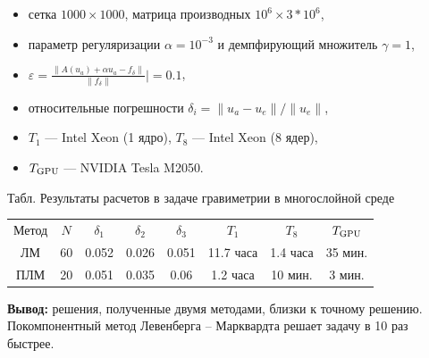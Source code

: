 \documentclass[10pt,pdf, mathserif, hyperref={unicode}]{beamer}
\begin{document}
\begin{frame}
	\begin{itemize}
		\item сетка $1000\times1000$, матрица производных $10^6\times 3*10^6$,
		\item параметр регуляризации $\alpha=10^{-3}$ и демпфирующий множитель $\gamma=1$,
		\item $\varepsilon=\frac{\|A(u_a)+\alpha u_a-f_\delta\|}{\|f_\delta\|}|=0.1$,
		\item относительные погрешности $\delta_i=\|u_a-u_e\|/\|u_e\|$,
		\item $T_1$ --- Intel Xeon (1 ядро), $T_8$ --- Intel Xeon (8 ядер),	
		\item $T_{\textup{GPU}}$ --- NVIDIA Tesla M2050.
	\end{itemize}
	\begin{table} 
		\centering
		\renewcommand{\arraystretch}{1.5} 
		{\scriptsize Табл. Результаты расчетов в задаче гравиметрии в многослойной среде}
		\small
\begin{tabular}{|c|c|c|c|c|c|c|c|}
\hline
\multirow{2}{*}{Метод} & \multirow{2}{*}{$N$} & \multirow{2}{*}{$\delta_1$} & \multirow{2}{*}{$\delta_2$} & \multirow{2}{*}{$\delta_3$} & \multirow{2}{*}{$T_1$} & \multirow{2}{*}{$T_8$} & \multirow{2}{*}{$T_{\textup{GPU}}$} \\
                       &                      &                             &                             &                             &                        &                        &                                     \\ \hline
ЛМ                     & 60                   & 0.052                       & 0.026                       & 0.051                       & 11.7 часа                & 1.4 часа                 & 35 мин.                             \\ \hline
\rowcolor{Green}
ПЛМ                    & 20                   & 0.051                       & 0.035                       & 0.06                        & 1.2 часа                 & 10 мин.                & 3 мин.                              \\ \hline
\end{tabular}
	\end{table}

\textbf{\color{blue}Вывод:} решения, полученные двумя методами, близки к точному решению. Покомпонентный метод Левенберга -- Марквардта решает задачу в 10 раз быстрее.
\end{frame}
\end{document}
